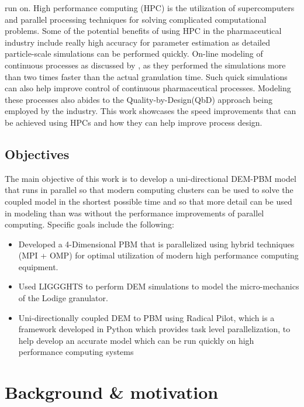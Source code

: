 \documentclass[preprint,11pt,authoryear]{elsarticle}
\begin{document}
run on.
 High performance computing (HPC) is the utilization of supercomputers and parallel processing
techniques for solving complicated computational problems. Some of the potential benefits of using
HPC in the pharmaceutical industry include really high accuracy for parameter estimation as detailed 
particle-scale simulations can be performed quickly. On-line modeling of continuous processes as 
discussed by \citep{Bettencourt2017}, as they performed the simulations more than two times faster 
than the actual granulation time. Such quick simulations can also help improve control of 
continuous pharmaceutical processes. Modeling these processes also abides to the 
Quality-by-Design(QbD) approach being employed by the industry. This work showcases the speed 
improvements that can be achieved using HPCs and how they can help improve process design.  
\subsection{Objectives}
 The main objective of this work is to develop a uni-directional DEM-PBM model that runs in 
parallel so that modern computing clusters can be used to solve the coupled model in the 
shortest possible time and so that more detail can be used in modeling than was without the performance improvements of parallel computing. Specific goals include the 
following:
\begin{itemize}
\item Developed a 4-Dimensional PBM that is parallelized using hybrid techniques (MPI + 
OMP)  for optimal utilization of modern high performance computing equipment.
\item Used LIGGGHTS to perform DEM simulations to  model the micro-mechanics of the 
Lodige granulator. 
\item Uni-directionally coupled DEM to PBM using Radical Pilot, which is a framework developed in
Python which provides task level parallelization, to help develop an accurate model which can be 
run quickly on high performance computing systems
\end{itemize}

\section{Background \& motivation}
\end{document}
